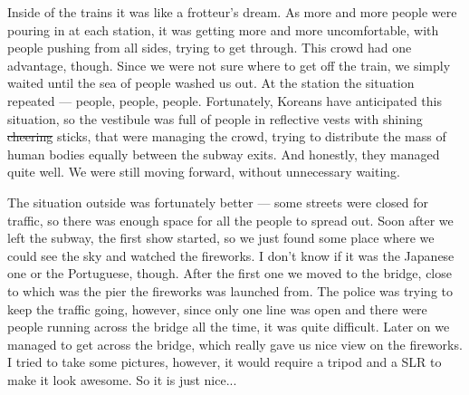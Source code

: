 \begin{post}
\begin{content}

Inside of the trains it was like a frotteur's dream. As more and more people were pouring in at each station, it was getting more and more uncomfortable, with people pushing from all sides, trying to get through. This crowd had one advantage, though. Since we were not sure where to get off the train, we simply waited until the sea of people washed us out. At the station the situation repeated — people, people, people. Fortunately, Koreans have anticipated this situation, so the vestibule was full of people in reflective vests with shining \sout{cheering} sticks, that were managing the crowd, trying to distribute the mass of human bodies equally between the subway exits. And honestly, they managed quite well. We were still moving forward, without unnecessary waiting.


The situation outside was fortunately better — some streets were closed for traffic, so there was enough space for all the people to spread out. Soon after we left the subway, the first show started, so we just found some place where we could see the sky and watched the fireworks. I don't know if it was the Japanese one or the Portuguese, though. After the first one we moved to the bridge, close to which was the pier the fireworks was launched from. The police was trying to keep the traffic going, however, since only one line was open and there were people running across the bridge all the time, it was quite difficult. Later on we managed to get across the bridge, which really gave us nice view on the fireworks. I tried to take some pictures, however, it would require a tripod and a SLR to make it look awesome. So it is just nice...


\end{content}
\end{post}
